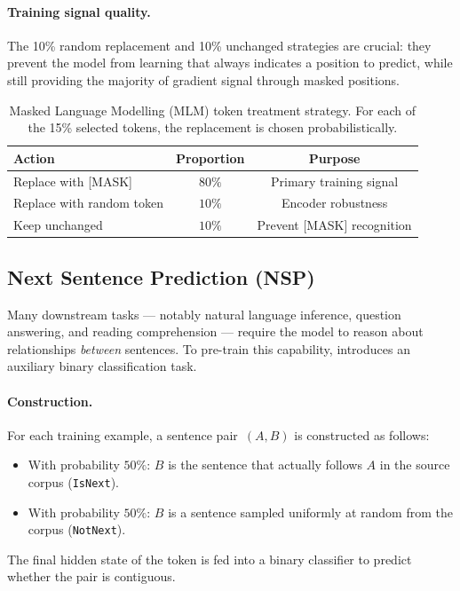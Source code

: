 \paragraph{Training signal quality.}  The 10\% random replacement and 10\%
unchanged strategies are crucial: they prevent the model from learning that
\mask{} always indicates a position to predict, while still providing the majority
of gradient signal through masked positions.

\begin{table}[H]
  \centering
  \caption{Masked Language Modelling (MLM) token treatment strategy. For each of
           the 15\% selected tokens, the replacement is chosen probabilistically.}
  \label{tab:mlm_strategy}
  \renewcommand{\arraystretch}{1.4}
  \begin{tabular}{lcc}
    \toprule
    \textbf{Action} & \textbf{Proportion} & \textbf{Purpose} \\
    \midrule
    Replace with [MASK] & $80\%$ & Primary training signal \\
    Replace with random token & $10\%$ & Encoder robustness \\
    Keep unchanged & $10\%$ & Prevent [MASK] recognition \\
    \bottomrule
  \end{tabular}
\end{table}

\subsection{Next Sentence Prediction (NSP)}
\label{subsec:nsp}

Many downstream tasks --- notably natural language inference, question answering,
and reading comprehension --- require the model to reason about relationships
\emph{between} sentences.  To pre-train this capability, \bert{} introduces an
auxiliary binary classification task.

\paragraph{Construction.}  For each training example, a sentence pair~$(A, B)$ is
constructed as follows:
\begin{itemize}
  \item With probability $50\%$: $B$ is the sentence that actually follows $A$ in
        the source corpus (\texttt{IsNext}).
  \item With probability $50\%$: $B$ is a sentence sampled uniformly at random
        from the corpus (\texttt{NotNext}).
\end{itemize}
The final hidden state of the \cls{} token is fed into a binary classifier to
predict whether the pair is contiguous.

